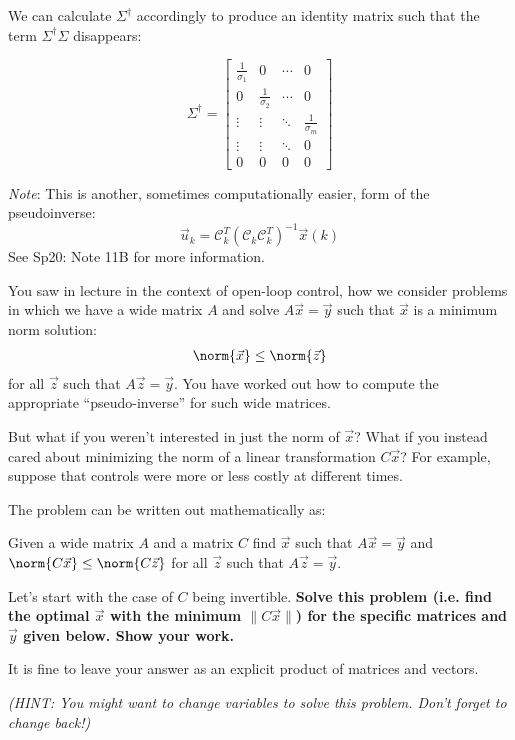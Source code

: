 We can calculate $\Sigma^{\dagger}$ accordingly to produce an identity matrix such that the term $\Sigma^{\dagger}\Sigma$ disappears:

$$\Sigma^{\dagger} = \begin{bmatrix} \frac{1}{\sigma_{1}} & 0 &  \cdots & 0 \\ 0 & \frac{1}{\sigma_{2}} & \cdots & 0 \\ \vdots & \vdots & \ddots & \frac{1}{\sigma_{m}} \\
    \vdots & \vdots & \ddots & 0 \\ 0 & 0 & 0 & 0 \end{bmatrix}$$

\textit{Note}: This is another, sometimes computationally easier, form of the pseudoinverse:
$$\vec{u}_k = \mathcal{C}_k^T(\mathcal{C}_k\mathcal{C}_k^T)^{-1}\vec{x}(k)$$
See Sp20: Note 11B for more information.

\newpage

You saw in lecture in the context of open-loop control, how we
consider problems in which we have a wide
matrix $A$ and solve $A \vec{x} = \vec{y}$ such that $\vec{x}$
is a minimum norm solution:
\begin{align*}
\norm{\vec{x}} \leq \norm{\vec{z}}
\end{align*}
for all $\vec{z}$ such that $A \vec{z} = \vec{y}$. You have worked out how to compute the appropriate ``pseudo-inverse'' for
such wide matrices.

But what if you weren't interested in just the norm of $\vec{x}$? What
if you instead cared about minimizing the norm of a linear transformation $C\vec{x}$? For example, suppose that controls were more or less costly
at different times.

The problem can be written out mathematically as:

Given a wide matrix  $A$ and a matrix $C$ find $\vec{x}$ such that $A \vec{x} = \vec{y}$ and
$\norm{C\vec{x}} \leq \norm{C\vec{z}} $ for all
$\vec{z}$ such that $A \vec{z} = \vec{y}$.


Let's start with the case of $C$ being invertible. {\bfseries Solve
  this problem (i.e. find the optimal $\vec{x}$ with the minimum $\|C \vec{x}\|$) for the specific
  matrices and $\vec{y}$ given below. Show your work.}

It is fine to leave your answer as an explicit product of
matrices and vectors.

{\em (HINT: You might want to change variables to solve this
  problem. Don't forget to change back!)}

